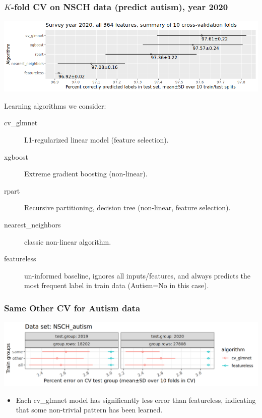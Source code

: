 \documentclass{beamer}
\begin{document}
\begin{frame}
  \frametitle{$K$-fold CV on NSCH data (predict autism), year 2020}
  \includegraphics[width=\textwidth]{download-nsch-mlr3batchmark-registry-one-set-all-features-stats.png}

Learning algorithms we consider:
\begin{description}
\item[cv\_glmnet] L1-regularized linear model (feature selection).
\item[xgboost] Extreme gradient boosting (non-linear).
\item[rpart] Recursive partitioning, decision tree (non-linear, feature selection).
\item[nearest\_neighbors] classic non-linear algorithm.
\item[featureless] un-informed baseline, ignores all inputs/features,
  and always predicts the most frequent label in train data (Autism=No
  in this case).
\end{description}

\end{frame}

\begin{frame}
  \frametitle{Same Other CV for Autism data}
  \includegraphics[width=\textwidth]{NSCH_autism_error_glmnet_featureless_mean_SD.png}
  \begin{itemize}
  \item Each cv\_glmnet model has significantly less error than
    featureless, indicating that some non-trivial pattern has been
    learned.
  \end{itemize}
\end{frame}
\end{document}
